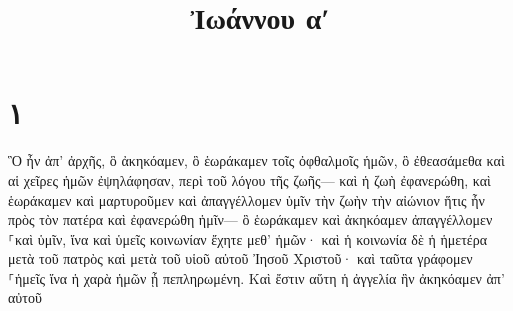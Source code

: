 \documentclass{openreader}
\title{Ἰωάννου αʹ}
\date{}
\begin{document}
\maketitle
\raggedbottom 
\fontsize{16pt}{24pt}\selectfont
\section*{۱}
Ὃ ἦν ἀπ’ ἀρχῆς, ὃ ἀκηκόαμεν, ὃ ἑωράκαμεν τοῖς ὀφθαλμοῖς ἡμῶν, ὃ ἐθεασάμεθα καὶ αἱ χεῖρες ἡμῶν ἐψηλάφησαν, περὶ τοῦ λόγου τῆς ζωῆς— καὶ ἡ ζωὴ ἐφανερώθη, καὶ ἑωράκαμεν καὶ μαρτυροῦμεν καὶ ἀπαγγέλλομεν ὑμῖν τὴν ζωὴν τὴν αἰώνιον ἥτις ἦν πρὸς τὸν πατέρα καὶ ἐφανερώθη ἡμῖν— ὃ ἑωράκαμεν καὶ ἀκηκόαμεν ἀπαγγέλλομεν ⸀καὶ ὑμῖν, ἵνα καὶ ὑμεῖς κοινωνίαν ἔχητε μεθ’ ἡμῶν· καὶ ἡ κοινωνία δὲ ἡ ἡμετέρα μετὰ τοῦ πατρὸς καὶ μετὰ τοῦ υἱοῦ αὐτοῦ Ἰησοῦ Χριστοῦ· καὶ ταῦτα γράφομεν ⸀ἡμεῖς ἵνα ἡ χαρὰ ἡμῶν ᾖ πεπληρωμένη. Καὶ ἔστιν αὕτη ἡ ἀγγελία ἣν ἀκηκόαμεν ἀπ’ αὐτοῦ 
\end{document}
